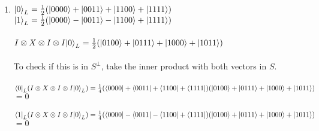 \documentclass{assignment}
\begin{document}
\begin{problemlist}

  \pbitem
  \begin{problem}
  \end{problem}
  \begin{answer}
    \\
    \begin{enumerate}
    \item
      $\ket{0}_L = \frac{1}{2} (\ket{0000} + \ket{0011} + \ket{1100} + \ket{1111})$\\
      $\ket{1}_L = \frac{1}{2} (\ket{0000} - \ket{0011} - \ket{1100} + \ket{1111})$\\\\
      $I \otimes X \otimes I \otimes I \ket{0}_L =\frac{1}{2} (\ket{0100} + \ket{0111} + \ket{1000} + \ket{1011})$\\\\
      To check if this is in $S^\perp$, take the inner product with both vectors in $S$.\\\\
      $\bra{0}_L(I \otimes X \otimes I \otimes I \ket{0}_L)=\frac{1}{4} (\bra{0000} + \bra{0011} + \bra{1100} + \bra{1111})(\ket{0100} + \ket{0111} + \ket{1000} + \ket{1011})$\\
      $=0$\\\\
      $\bra{1}_L(I \otimes X \otimes I \otimes I \ket{0}_L)=\frac{1}{4} (\bra{0000} - \bra{0011} - \bra{1100} + \bra{1111})(\ket{0100} + \ket{0111} + \ket{1000} + \ket{1011})$\\
      $=0$\\


\end{enumerate}
\end{answer}
\end{problemlist}
\end{document}
